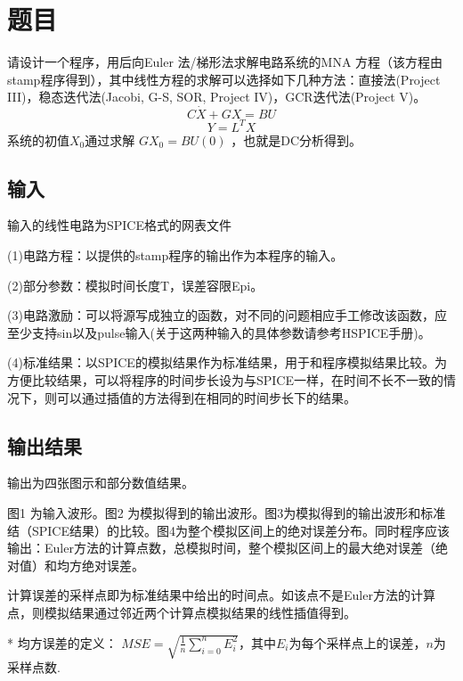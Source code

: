 \documentclass[12pt]{article}
\begin{document}
\section{题目}
\qquad 请设计一个程序，用后向Euler 法/梯形法求解电路系统的MNA 方程（该方程由stamp程序得到），其中线性方程的求解可以选择如下几种方法：直接法(Project III)，稳态迭代法(Jacobi, G-S, SOR, Project IV)，GCR迭代法(Project V)。
\begin{equation}
\label{MNA}
C \dot{X}+G X=B U
\end{equation}
\begin{equation}
Y=L^T X 
\end{equation}
系统的初值$X_0$通过求解 $GX_0 = BU(0)$ ，也就是DC分析得到。

\subsection{输入}
\qquad 输入的线性电路为SPICE格式的网表文件 \par
\qquad (1)电路方程：以提供的stamp程序的输出作为本程序的输入。 \par
\qquad (2)部分参数：模拟时间长度T，误差容限Epi。 \par
\qquad (3)电路激励：可以将源写成独立的函数，对不同的问题相应手工修改该函数，应至少支持sin以及pulse输入(关于这两种输入的具体参数请参考HSPICE手册)。 \par
\qquad (4)标准结果：以SPICE的模拟结果作为标准结果，用于和程序模拟结果比较。为方便比较结果，可以将程序的时间步长设为与SPICE一样，在时间不长不一致的情况下，则可以通过插值的方法得到在相同的时间步长下的结果。 \par

\subsection{输出结果}
\qquad 输出为四张图示和部分数值结果。 \par
\qquad 图1 为输入波形。图2 为模拟得到的输出波形。图3为模拟得到的输出波形和标准结（SPICE结果）的比较。图4为整个模拟区间上的绝对误差分布。同时程序应该输出：Euler方法的计算点数，总模拟时间，整个模拟区间上的最大绝对误差（绝对值）和均方绝对误差。 \par
\qquad * 计算误差的采样点即为标准结果中给出的时间点。如该点不是Euler方法的计算点，则模拟结果通过邻近两个计算点模拟结果的线性插值得到。 \par
\qquad ** 均方误差的定义： $MSE=\sqrt{\frac{1}{n}\sum_{i=0}^{n}E_i^2}$，其中$E_i$为每个采样点上的误差，$n$为采样点数. \par
\end{document}
